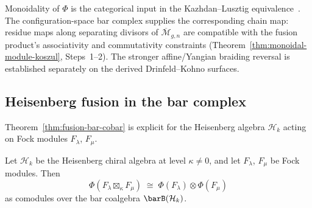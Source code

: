 \begin{remark}\label{rem:fusion-scope}
Monoidality of $\Phi$ is the categorical input in the
Kazhdan--Lusztig equivalence~\cite{KL93}. The configuration-space
bar complex supplies the corresponding chain map: residue
maps along separating divisors of $\overline{\mathcal{M}}_{g,n}$
are compatible with the fusion product's associativity and commutativity
constraints (Theorem~\ref{thm:monoidal-module-koszul},
Steps~1--2). The stronger affine/Yangian braiding reversal is
established separately on the derived Drinfeld--Kohno surfaces.
\end{remark}

\subsection{Heisenberg fusion in the bar complex}
\label{subsec:heisenberg-fusion-verification}

Theorem~\ref{thm:fusion-bar-cobar} is explicit for the Heisenberg algebra
$\mathcal{H}_k$ acting on Fock modules $F_\lambda$, $F_\mu$.

\begin{proposition}\label{prop:heisenberg-fusion-splitting}
Let $\mathcal{H}_k$ be the Heisenberg chiral algebra at
level $\kappa \neq 0$, and let $F_\lambda$, $F_\mu$ be Fock
modules. Then
\begin{equation}\label{eq:heisenberg-fusion-splitting}
\Phi(F_\lambda \boxtimes_\kappa F_\mu)
\;\cong\;
\Phi(F_\lambda) \otimes \Phi(F_\mu)
\end{equation}
as comodules over the bar coalgebra $\barB(\mathcal{H}_k)$.
\end{proposition}

